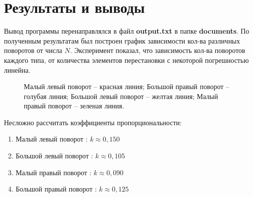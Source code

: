 \documentclass[a4paper,12pt] {report} 			%
\begin{document}
\section{Результаты и выводы}

Вывод программы перенаправлялся в файл \textbf{output.txt} в папке \textbf{documents}. По полученным результатам был построен график зависимости кол-ва 
различных поворотов от числа  $N$. Эксперимент показал, что зависимость кол-ва поворотов каждого типа, от количества элементов перестановки с некоторой 
погрешностью линейна.

\begin{figure} [h]
\caption{Малый левый поворот -- красная линия; Большой правый поворот -- голубая линия; Большой левый поворот -- желтая линия; 
Малый правый поворот -- зеленая линия.}
\end{figure}

Несложно рассчитать коэффициенты пропорциональности:

\begin{enumerate}
	\item Малый левый поворот : $k \approx 0,150$
	\item Большой левый поворот : $k \approx 0,105$
	\item Малый правый поворот : $k \approx 0,090$
	\item Большой правый поворот : $k \approx 0,125$
\end{enumerate}
\end{document}
